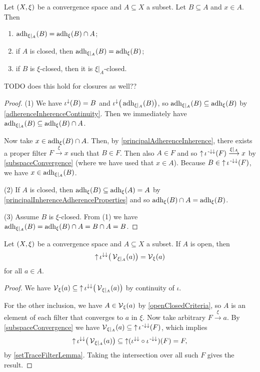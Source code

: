 \begin{proposition} \label{subspaceAdherence}
Let $\left( X,\xi \right)$ be a convergence space and $A\subseteq X$ a subset. Let $B\subseteq A$ and $x\in A$. Then
\begin{enumerate}
\item $\operatorname{adh}_{\xi|_A}(B) = \operatorname{adh}_\xi(B) \cap A$;
\item if $A$ is closed, then $\operatorname{adh}_{\xi|_A}(B) = \operatorname{adh}_\xi(B)$;
\item if $B$ is $\xi$-closed, then it is $\xi|_A$-closed.
\end{enumerate}
\end{proposition}
TODO does this hold for closures as well??
\begin{proof}
(1) We have $\iota^\downarrow(B) = B$ and $\iota^\downarrow\big(\operatorname{adh}_{\xi|_A}(B)\big)$, so $\operatorname{adh}_{\xi|_A}(B) \subseteq \operatorname{adh}_\xi(B)$ by \ref{adherenceInherenceContinuity}. Then we immediately have $\operatorname{adh}_{\xi|_A}(B) \subseteq \operatorname{adh}_\xi(B) \cap A$.

Now take $x\in \operatorname{adh}_\xi(B) \cap A$. Then, by \ref{principalAdherenceInherence}, there exists a proper filter $F\overset{\xi}{\longrightarrow} x$ such that $B\in F$. Then also $A\in F$ and so $\operatorname{\uparrow} \iota^{{\text{\hspace{0.15em}-}\downarrow}\downarrow}(F)\overset{\xi|_A}{\longrightarrow} x$ by \ref{subspaceConvergence} (where we have used that $x\in A$). Because $B\in \operatorname{\uparrow} \iota^{{\text{\hspace{0.15em}-}\downarrow}\downarrow}(F)$, we have $x\in \operatorname{adh}_{\xi|_A}(B)$.

(2) If $A$ is closed, then $\operatorname{adh}_\xi(B)\subseteq \operatorname{adh}_\xi(A) = A$ by \ref{principalInherenceAdherenceProperties} and so $\operatorname{adh}_\xi(B)\cap A = \operatorname{adh}_\xi(B)$.

(3) Assume $B$ is $\xi$-closed. From (1) we have $\operatorname{adh}_{\xi|_A}(B) = \operatorname{adh}_\xi(B) \cap A = B\cap A = B$.
\end{proof}

\begin{proposition} \label{subspaceVicinityFilter}
Let $\left( X,\xi \right)$ be a convergence space and $A\subseteq X$ a subset. If $A$ is open, then
\[ \operatorname{\uparrow}\iota^{\downarrow\downarrow}\big(\operatorname{\mathcal{V}}_{\xi|_A}(a)\big) = \operatorname{\mathcal{V}}_\xi(a) \]
for all $a\in A$.
\end{proposition}
\begin{proof}
We have $\operatorname{\mathcal{V}}_\xi(a) \subseteq \operatorname{\uparrow}\iota^{\downarrow\downarrow}\big(\operatorname{\mathcal{V}}_{\xi|_A}(a)\big)$ by continuity of $\iota$.

For the other inclusion, we have $A\in \operatorname{\mathcal{V}}_\xi(a)$ by \ref{openClosedCriteria}, so $A$ is an element of each filter that converges to $a$ in $\xi$. Now take arbitrary $F\overset{\xi}{\longrightarrow} a$. By \ref{subspaceConvergence} we have $\operatorname{\mathcal{V}}_{\xi|_A}(a) \subseteq \operatorname{\uparrow} \iota^{{\text{\hspace{0.15em}-}\downarrow}\downarrow}(F)$, which implies
\[ \operatorname{\uparrow} \iota^{\downarrow\downarrow}\big(\operatorname{\mathcal{V}}_{\xi|_A}(a)\big) \subseteq \operatorname{\uparrow} (\iota^{\downarrow\downarrow}\circ \iota^{{\text{\hspace{0.15em}-}\downarrow}\downarrow})(F) = F, \]
by \ref{setTraceFilterLemma}. Taking the intersection over all such $F$ gives the result.
\end{proof}

